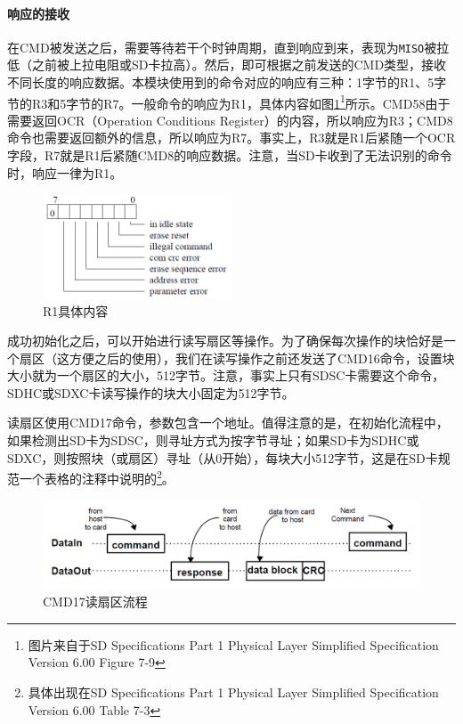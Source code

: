 \documentclass[11pt,utf8]{report}
\begin{document}
	\paragraph{响应的接收} 在CMD被发送之后，需要等待若干个时钟周期，直到响应到来，表现为\texttt{MISO}被拉低（之前被上拉电阻或SD卡拉高）。然后，即可根据之前发送的CMD类型，接收不同长度的响应数据。本模块使用到的命令对应的响应有三种：1字节的R1、5字节的R3和5字节的R7。一般命令的响应为R1，具体内容如图\ref{r1}\footnote{图片来自于SD Specifications Part 1 Physical Layer Simplified Specification Version 6.00 Figure 7-9}所示。CMD58由于需要返回OCR（Operation Conditions Register）的内容，所以响应为R3；CMD8命令也需要返回额外的信息，所以响应为R7。事实上，R3就是R1后紧随一个OCR字段，R7就是R1后紧随CMD8的响应数据。注意，当SD卡收到了无法识别的命令时，响应一律为R1。
	
	\begin{figure}[h!]
		\centering
		\includegraphics[width=0.5\textwidth]{r1}
		\caption{R1具体内容}
		\label{r1}
	\end{figure}

	\par 成功初始化之后，可以开始进行读写扇区等操作。为了确保每次操作的块恰好是一个扇区（这方便之后的使用），我们在读写操作之前还发送了CMD16命令，设置块大小就为一个扇区的大小，512字节。注意，事实上只有SDSC卡需要这个命令，SDHC或SDXC卡读写操作的块大小固定为512字节。
	
	\par 读扇区使用CMD17命令，参数包含一个地址。值得注意的是，在初始化流程中，如果检测出SD卡为SDSC，则寻址方式为按字节寻址；如果SD卡为SDHC或SDXC，则按照块（或扇区）寻址（从0开始），每块大小512字节，这是在SD卡规范一个表格的注释中说明的\footnote{具体出现在SD Specifications Part 1 Physical Layer Simplified Specification Version 6.00 Table 7-3}。 
	
	\begin{figure}[h!]
		\centering
		\includegraphics[width=\textwidth]{cmd17}
		\caption{CMD17读扇区流程}
		\label{cmd17}
	\end{figure}
	
\end{document}
